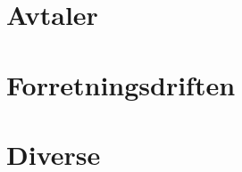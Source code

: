 \documentclass[11pt, a4paper, twosided]{book}
\begin{document}

































\part{Avtaler}




\part{Forretningsdriften}




\part{Diverse}


\end{document}

